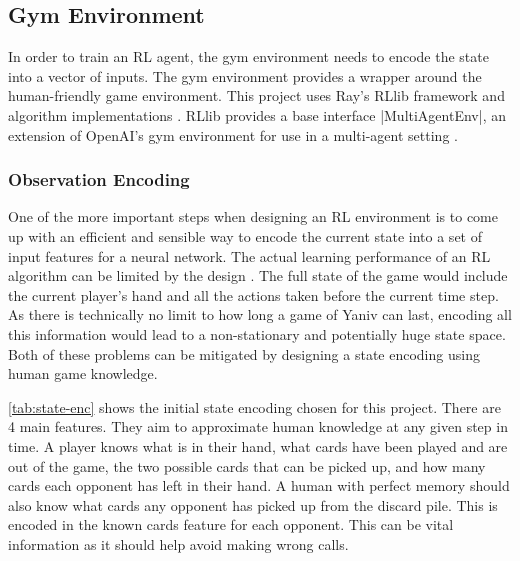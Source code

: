 \documentclass[../main.tex]{subfiles}
\begin{document}
\subsection{Gym Environment}
In order to train an RL agent, the gym environment needs to encode the state into a vector of inputs. The gym environment provides a wrapper around the human-friendly game environment. This project uses Ray's RLlib framework and algorithm implementations \cite{liang_rllib_2018}. RLlib provides a base interface |MultiAgentEnv|, an extension of OpenAI's gym environment for use in a multi-agent setting \cite{brockman_openai_2016,seita_scaling_nodate}. 

\subsubsection{Observation Encoding}
One of the more important steps when designing an RL environment is to come up with an efficient and sensible way to encode the current state into a set of input features for a neural network. The actual learning performance of an RL algorithm can be limited by the design \cite{sutton_reinforcement_2018}. The full state of the game would include the current player's hand and all the actions taken before the current time step. As there is technically no limit to how long a game of Yaniv can last, encoding all this information would lead to a non-stationary and potentially huge state space. Both of these problems can be mitigated by designing a state encoding using human game knowledge. 

\cref{tab:state-enc} shows the initial state encoding chosen for this project. There are 4 main features. They aim to approximate human knowledge at any given step in time. A player knows what is in their hand, what cards have been played and are out of the game, the two possible cards that can be picked up, and how many cards each opponent has left in their hand. A human with perfect memory should also know what cards any opponent has picked up from the discard pile. This is encoded in the known cards feature for each opponent. This can be vital information as it should help avoid making wrong calls. 
\end{document}
